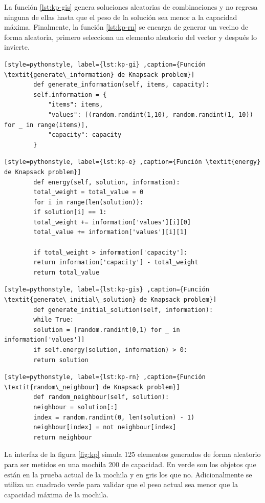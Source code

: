 \documentclass[12pt,twoside]{article}
\begin{document}
	La función \ref{lst:kp-gis} genera soluciones aleatorias de combinaciones y no regresa ninguna de ellas hasta que el peso de la solución sea menor a la capacidad máxima. Finalmente, la función \ref{lst:kp-rn} se encarga de generar un vecino de forma aleatoria, primero selecciona un elemento aleatorio del vector y después lo invierte.  
	
	\begin{lstlisting}[style=pythonstyle, label={lst:kp-gi} ,caption={Función \textit{generate\_information} de Knapsack problem}]
		def generate_information(self, items, capacity):
		self.information = {
			"items": items,
			"values": [(random.randint(1,10), random.randint(1, 10)) for _ in range(items)],
			"capacity": capacity
		}
	\end{lstlisting}
	
	\begin{lstlisting}[style=pythonstyle, label={lst:kp-e} ,caption={Función \textit{energy} de Knapsack problem}]
		def energy(self, solution, information):
		total_weight = total_value = 0
		for i in range(len(solution)):
		if solution[i] == 1:
		total_weight += information['values'][i][0]
		total_value += information['values'][i][1]
		
		if total_weight > information['capacity']:
		return information['capacity'] - total_weight
		return total_value
	\end{lstlisting}
	
	\begin{lstlisting}[style=pythonstyle, label={lst:kp-gis} ,caption={Función \textit{generate\_initial\_solution} de Knapsack problem}]
		def generate_initial_solution(self, information):
		while True:
		solution = [random.randint(0,1) for _ in information['values']]
		if self.energy(solution, information) > 0:
		return solution
	\end{lstlisting}
	
	
	\begin{lstlisting}[style=pythonstyle, label={lst:kp-rn} ,caption={Función \textit{random\_neighbour} de Knapsack problem}]
		def random_neighbour(self, solution):
		neighbour = solution[:]
		index = random.randint(0, len(solution) - 1)
		neighbour[index] = not neighbour[index]
		return neighbour     
	\end{lstlisting}
	
	La interfaz de la figura \ref{fig:kp} simula 125 elementos generados de forma aleatorio para ser metidos en una mochila 200 de capacidad. En verde son los objetos que están en la prueba actual de la mochila y en gris los que no. Adicionalmente se utiliza un cuadrado verde para validar que el peso actual sea menor que la capacidad máxima de la mochila.
	
\end{document}
